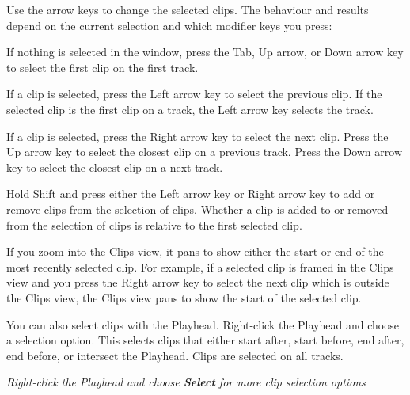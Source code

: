 Use the arrow keys to change the selected clips. The behaviour and results depend on the current selection and which modifier keys you press\+:


\begin{DoxyItemize}
\item If nothing is selected in the  window, press the Tab, Up arrow, or Down arrow key to select the first clip on the first track.
\item If a clip is selected, press the Left arrow key to select the previous clip. If the selected clip is the first clip on a track, the Left arrow key selects the track.
\item If a clip is selected, press the Right arrow key to select the next clip. Press the Up arrow key to select the closest clip on a previous track. Press the Down arrow key to select the closest clip on a next track.
\item Hold Shift and press either the Left arrow key or Right arrow key to add or remove clips from the selection of clips. Whether a clip is added to or removed from the selection of clips is relative to the first selected clip.
\end{DoxyItemize}

If you zoom into the Clips view, it pans to show either the start or end of the most recently selected clip. For example, if a selected clip is framed in the Clips view and you press the Right arrow key to select the next clip which is outside the Clips view, the Clips view pans to show the start of the selected clip.

You can also select clips with the  Playhead. Right-\/click the  Playhead and choose a selection option. This selects clips that either start after, start before, end after, end before, or intersect the  Playhead. Clips are selected on all tracks.



{\itshape Right-\/click the  Playhead and choose {\bfseries{Select}} for more clip selection options} 